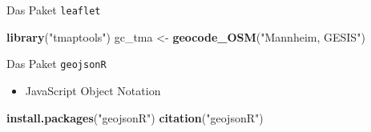 \documentclass[ignorenonframetext,]{beamer}
\newenvironment{Shaded}{\begin{snugshade}}{\end{snugshade}}
\newcommand{\DataTypeTok}[1]{\textcolor[rgb]{0.13,0.29,0.53}{#1}}
\newcommand{\FloatTok}[1]{\textcolor[rgb]{0.00,0.00,0.81}{#1}}
\newcommand{\KeywordTok}[1]{\textcolor[rgb]{0.13,0.29,0.53}{\textbf{#1}}}
\newcommand{\NormalTok}[1]{#1}
\newcommand{\OperatorTok}[1]{\textcolor[rgb]{0.81,0.36,0.00}{\textbf{#1}}}
\newcommand{\StringTok}[1]{\textcolor[rgb]{0.31,0.60,0.02}{#1}}
\providecommand{\tightlist}{%
  \setlength{\itemsep}{0pt}\setlength{\parskip}{0pt}}
\begin{document}
\begin{frame}[fragile]{Das Paket \texttt{leaflet}}
\protect\hypertarget{das-paket-leaflet}{}

\begin{Shaded}
\begin{Highlighting}[]
\KeywordTok{library}\NormalTok{(}\StringTok{"tmaptools"}\NormalTok{)}
\NormalTok{gc_tma <-}\StringTok{ }\KeywordTok{geocode_OSM}\NormalTok{(}\StringTok{"Mannheim, GESIS"}\NormalTok{)}
\end{Highlighting}
\end{Shaded}

\begin{Shaded}
\end{Shaded}

\end{frame}

\begin{frame}[fragile]{Das Paket \texttt{geojsonR}}
\protect\hypertarget{das-paket-geojsonr}{}

\begin{itemize}
\tightlist
\item
  JavaScript Object Notation
\end{itemize}

\begin{Shaded}
\begin{Highlighting}[]
\KeywordTok{install.packages}\NormalTok{(}\StringTok{"geojsonR"}\NormalTok{)}
\KeywordTok{citation}\NormalTok{(}\StringTok{"geojsonR"}\NormalTok{)}
\end{Highlighting}
\end{Shaded}

\end{frame}
\end{document}
